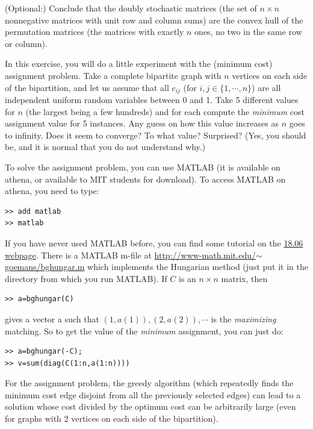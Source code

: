 \documentclass[12pt]{article}
\begin{document}
\begin{exercises}
(Optional:) Conclude that the doubly stochastic matrices (the set of $n\times n$ nonnegative matrices with unit row and column sums) are the convex hull of the permutation matrices (the matrices with exactly $n$ ones, no two in the same row or column).
\item
In this exercise, you will do a little experiment with the (minimum
cost) assignment problem. Take a complete bipartite graph with $n$
vertices on each side of the bipartition, and let us assume that all
$c_{ij}$ (for $i,j\in\{1,\cdots,n\}$) are all independent uniform
random variables between 0 and 1. Take 5 different values for $n$ (the
largest being a few hundreds) and for each compute the {\it minimum}
cost assignment value for 5 instances. Any guess on how this value
increases as $n$ goes to infinity. Does it seem to converge? To what
value? Surprised? (Yes, you should be, and it is normal that you do
not understand why.)

To solve the assignment problem, you can use MATLAB (it is available on
athena, or available to MIT students for download). 
To access MATLAB on athena, you need to type:

\begin{verbatim}
>> add matlab
>> matlab
\end{verbatim}

If you have never used MATLAB before, you can find some tutorial on
the \href{http://web.mit.edu/18.06/www/}{18.06 webpage}. There is a
MATLAB m-file at \href{http://www-math.mit.edu/~goemans/bghungar.m}{http://www-math.mit.edu/$\sim$goemans/bghungar.m}
which implements the Hungarian method (just put it in the directory
from which you run MATLAB). If $C$ is an $n\times n$
matrix, then 

\begin{verbatim}
>> a=bghungar(C)
\end{verbatim}

gives a vector a such that $(1,a(1)), (2,a(2)), \cdots$ is the {\it
  maximizing} matching. So to get the value of the {\it minimum}
  assignment, you can just do:

\begin{verbatim}
>> a=bghungar(-C);
>> v=sum(diag(C(1:n,a(1:n))))
\end{verbatim}

\item 
  For the assignment problem, the greedy algorithm (which repeatedly
  finds the minimum cost edge disjoint from all the previously
  selected edges) can lead to a solution whose cost divided by the
  optimum cost can be arbitrarily large (even for graphs with 2
  vertices on each side of the bipartition).


\end{exercises}
\end{document}
